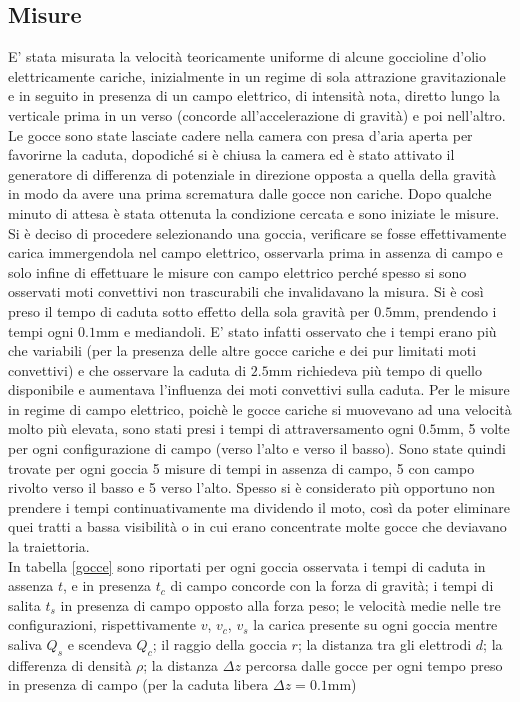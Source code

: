 \documentclass{article}
\begin{document}
\subsection{Misure}
    E' stata misurata la velocità teoricamente uniforme di alcune goccioline d’olio elettricamente cariche, inizialmente in un regime di sola attrazione gravitazionale e in seguito in presenza di un campo elettrico, di intensità nota, diretto lungo la verticale prima in un verso (concorde all'accelerazione di gravità) e poi nell'altro. \\
    Le gocce sono state lasciate cadere nella camera con presa d'aria aperta per favorirne la caduta, dopodiché si è chiusa la camera ed è stato attivato il generatore di differenza di potenziale in direzione opposta a quella della gravità in modo da avere una prima scrematura dalle gocce non cariche. Dopo qualche minuto di attesa è stata ottenuta la condizione cercata e sono iniziate le misure. \\
    Si è deciso di procedere selezionando una goccia, verificare se fosse effettivamente carica immergendola nel campo elettrico, osservarla prima in assenza di campo e solo infine di effettuare le misure con campo elettrico perché spesso si sono osservati moti convettivi non trascurabili che invalidavano la misura. Si è così preso il tempo di caduta sotto effetto della sola gravità per $0.5$mm, prendendo i tempi ogni $0.1$mm e mediandoli. E' stato infatti osservato che i tempi erano più che variabili (per la presenza delle altre gocce cariche e dei pur limitati moti convettivi) e che osservare la caduta di $2.5$mm richiedeva più tempo di quello disponibile e aumentava l'influenza dei moti convettivi sulla caduta. Per le misure in regime di campo elettrico, poichè le gocce cariche si muovevano ad una velocità molto più elevata, sono stati presi i tempi di attraversamento ogni $0.5$mm, 5 volte per ogni configurazione di campo (verso l'alto e verso il basso).
    Sono state quindi trovate per ogni goccia 5 misure di tempi in assenza di campo, 5 con campo rivolto verso il basso e 5 verso l'alto. Spesso si è considerato più opportuno non prendere i tempi continuativamente ma dividendo il moto, così da poter eliminare quei tratti a bassa visibilità o in cui erano concentrate molte gocce che deviavano la traiettoria.\\
    In tabella \ref{gocce} sono riportati per ogni goccia osservata i tempi di caduta in assenza $t$, e in presenza $t_c$ di campo concorde con la forza di gravità; i tempi di salita $t_s$ in presenza di campo opposto alla forza peso; le velocità medie nelle tre configurazioni, rispettivamente $v$, $v_c$, $v_s$ la carica presente su ogni goccia mentre saliva $Q_s$ e scendeva $Q_c$; il raggio della goccia $r$; la distanza tra gli elettrodi $d$; la differenza di densità $\rho$; la distanza $\Delta z$ percorsa dalle gocce per ogni tempo preso in presenza di campo (per la caduta libera $\Delta z = 0.1$mm)
    
\end{document}
